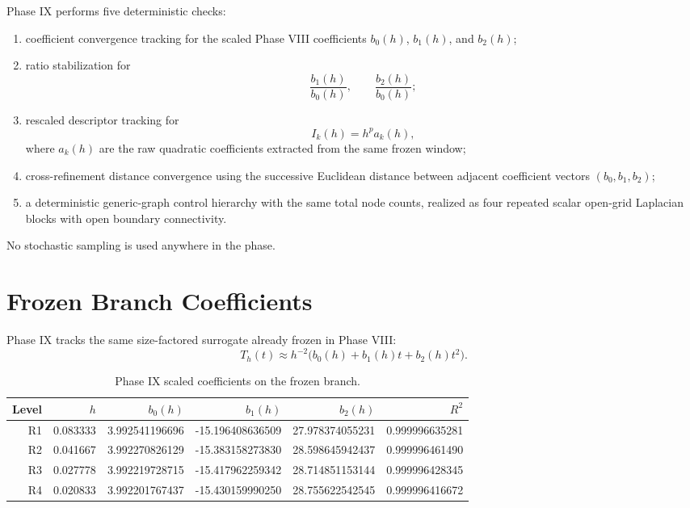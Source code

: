 \documentclass[11pt]{article}
\begin{document}
Phase IX performs five deterministic checks:
\begin{enumerate}
\item coefficient convergence tracking for the scaled Phase VIII coefficients $b_0(h)$, $b_1(h)$, and $b_2(h)$;
\item ratio stabilization for
\[
\frac{b_1(h)}{b_0(h)}, \qquad \frac{b_2(h)}{b_0(h)};
\]
\item rescaled descriptor tracking for
\[
I_k(h) = h^p a_k(h),
\]
where $a_k(h)$ are the raw quadratic coefficients extracted from the same frozen window;
\item cross-refinement distance convergence using the successive Euclidean distance between adjacent coefficient vectors $(b_0,b_1,b_2)$;
\item a deterministic generic-graph control hierarchy with the same total node counts, realized as four repeated scalar open-grid Laplacian blocks with open boundary connectivity.
\end{enumerate}

No stochastic sampling is used anywhere in the phase.

\section{Frozen Branch Coefficients}

Phase IX tracks the same size-factored surrogate already frozen in Phase VIII:
\[
T_h(t) \approx h^{-2}\bigl(b_0(h) + b_1(h)t + b_2(h)t^2\bigr).
\]

\begin{table}[t]
\centering
\small
\begin{tabular}{@{}rrrrrr@{}}
\toprule
Level & $h$ & $b_0(h)$ & $b_1(h)$ & $b_2(h)$ & $R^2$ \\
\midrule
R1 & 0.083333 & 3.992541196696 & -15.196408636509 & 27.978374055231 & 0.999996635281 \\
R2 & 0.041667 & 3.992270826129 & -15.383158273830 & 28.598645942437 & 0.999996461490 \\
R3 & 0.027778 & 3.992219728715 & -15.417962259342 & 28.714851153144 & 0.999996428345 \\
R4 & 0.020833 & 3.992201767437 & -15.430159990250 & 28.755622542545 & 0.999996416672 \\
\bottomrule
\end{tabular}
\caption{Phase IX scaled coefficients on the frozen branch.}
\label{tab:coefficients}
\end{table}
\end{document}
